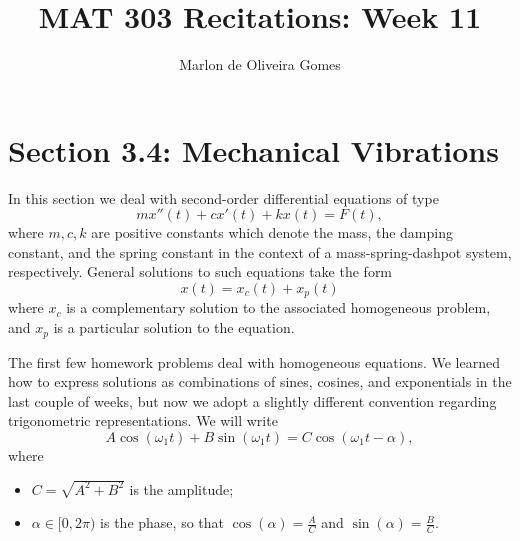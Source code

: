 \documentclass[11pt]{amsart}
\title{MAT 303 Recitations: Week 11}
\author[M. Gomes]{Marlon de Oliveira Gomes}
\numberwithin{equation}{section}
\begin{document}
\maketitle


\section*{Section 3.4: Mechanical Vibrations}

In this section we deal with second-order differential equations of type
\begin{equation*}
mx''(t)+cx'(t)+kx(t) = F(t),
\end{equation*}
where $m,c,k$ are positive constants which denote the mass, the damping constant, and the spring constant in the context of a mass-spring-dashpot system, respectively. General solutions to such equations take the form 
\begin{equation*}
x(t)=x_c(t)+x_p(t)
\end{equation*}
where $x_c$ is a complementary solution to the associated homogeneous problem, and $x_p$ is a particular solution to the equation. 

The first few homework problems deal with homogeneous equations. We learned how to express solutions as combinations of sines, cosines, and exponentials in the last couple of weeks, but now we adopt a slightly different convention regarding trigonometric representations. We will write 
\begin{equation*}
A\cos(\omega_1 t)+ B \sin(\omega_1 t) = C\cos(\omega_1 t -\alpha),
\end{equation*}
where 
\begin{itemize}
\item $C=\sqrt{A^2+B^2}$ is the amplitude; 
\item $\alpha \in [0, 2\pi)$ is the phase, so that $\cos(\alpha)=\frac{A}{C}$ and $\sin(\alpha)=\frac{B}{C}$.
\end{itemize} 
\end{document}
